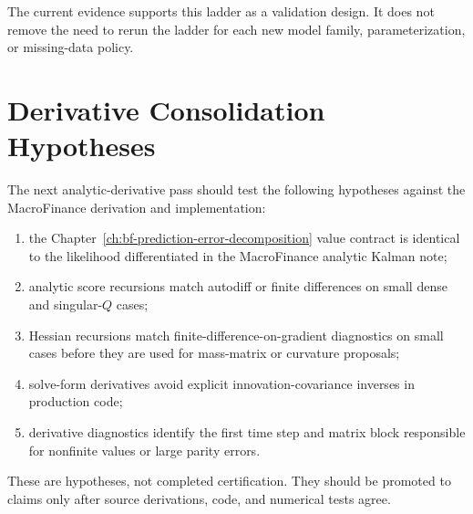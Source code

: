 The current evidence supports this ladder as a validation design.  It does not
remove the need to rerun the ladder for each new model family, parameterization,
or missing-data policy.

\section{Derivative Consolidation Hypotheses}
\label{sec:bf-lgssm-derivative-hypotheses}

The next analytic-derivative pass should test the following hypotheses against
the MacroFinance derivation and implementation:
\begin{enumerate}[label=(\roman*)]
  \item the Chapter~\ref{ch:bf-prediction-error-decomposition} value contract
    is identical to the likelihood differentiated in the MacroFinance analytic
    Kalman note;
  \item analytic score recursions match autodiff or finite differences on small
    dense and singular-$Q$ cases;
  \item Hessian recursions match finite-difference-on-gradient diagnostics on
    small cases before they are used for mass-matrix or curvature proposals;
  \item solve-form derivatives avoid explicit innovation-covariance inverses in
    production code;
  \item derivative diagnostics identify the first time step and matrix block
    responsible for nonfinite values or large parity errors.
\end{enumerate}
These are hypotheses, not completed certification.  They should be promoted to
claims only after source derivations, code, and numerical tests agree.
